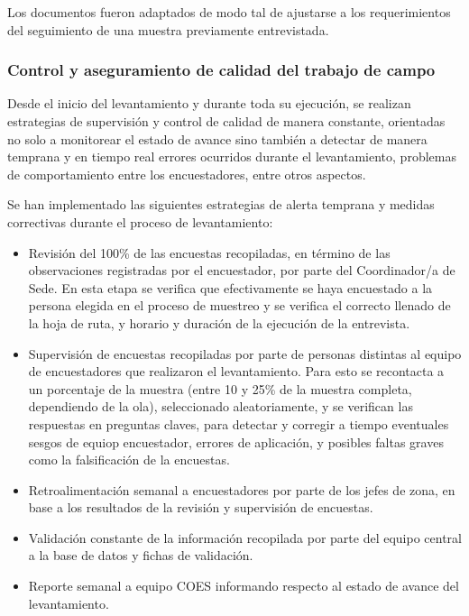 \documentclass[
  12pt,
]{article}
\begin{document}
Los documentos fueron adaptados de modo tal de ajustarse a los requerimientos del seguimiento de una muestra previamente entrevistada.

\hypertarget{control-y-aseguramiento-de-calidad-del-trabajo-de-campo}{%
\subsubsection*{Control y aseguramiento de calidad del trabajo de campo}\label{control-y-aseguramiento-de-calidad-del-trabajo-de-campo}}

Desde el inicio del levantamiento y durante toda su ejecución, se realizan estrategias de supervisión y control de calidad de manera constante, orientadas no solo a monitorear el estado de avance sino también a detectar de manera temprana y en tiempo real errores ocurridos durante el levantamiento, problemas de comportamiento entre los encuestadores, entre otros aspectos.

Se han implementado las siguientes estrategias de alerta temprana y medidas correctivas durante el proceso de levantamiento:

\begin{itemize}
\item
  Revisión del 100\% de las encuestas recopiladas, en término de las observaciones registradas por el encuestador, por parte del Coordinador/a de Sede. En esta etapa se verifica que efectivamente se haya encuestado a la persona elegida en el proceso de muestreo y se verifica el correcto llenado de la hoja de ruta, y horario y duración de la ejecución de la entrevista.
\item
  Supervisión de encuestas recopiladas por parte de personas distintas al equipo de encuestadores que realizaron el levantamiento. Para esto se recontacta a un porcentaje de la muestra (entre 10 y 25\% de la muestra completa, dependiendo de la ola), seleccionado aleatoriamente, y se verifican las respuestas en preguntas claves, para detectar y corregir a tiempo eventuales sesgos de equiop encuestador, errores de aplicación, y posibles faltas graves como la falsificación de la encuestas.
\item
  Retroalimentación semanal a encuestadores por parte de los jefes de zona, en base a los resultados de la revisión y supervisión de encuestas.
\item
  Validación constante de la información recopilada por parte del equipo central a la base de datos y fichas de validación.
\item
  Reporte semanal a equipo COES informando respecto al estado de avance del levantamiento.
\end{itemize}
\end{document}
